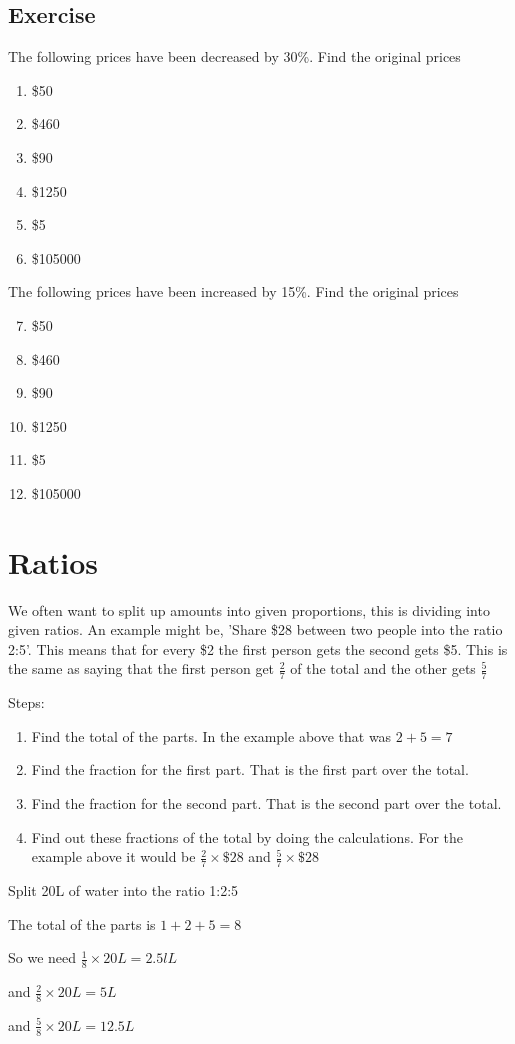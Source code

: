 \subsection{Exercise}
The following prices have been decreased by 30\%.  Find the original prices
\begin{enumerate}
	\item \$50
	\item \$460
	\item \$90
	\item \$1250
	\item \$5
	\item \$105000
\end{enumerate}
The following prices have been increased by 15\%.  Find the original prices
\begin{enumerate}
	\setcounter{enumi}{6}
	\item \$50
	\item \$460
	\item \$90
	\item \$1250
	\item \$5
	\item \$105000
\end{enumerate}
\section{Ratios}
We often want to split up amounts into given proportions, this is dividing into given ratios.  An example might be, 'Share \$28 between two people into the ratio 2:5'.  This means that for every \$2 the first person gets the second gets \$5.  This is the same as saying that the first person get $\displaystyle \frac{2}{7}$ of the total and the other gets $\displaystyle \frac{5}{7}$

Steps:

\begin{enumerate}
	\item Find the total of the parts.  In the example above that was $2+5=7$
	\item Find the fraction for the first part.  That is the first part over the total.
	\item Find the fraction for the second part.  That is the second part over the total.
	\item Find out these fractions of the total by doing the calculations.  For the example above it would be $\displaystyle \frac{2}{7} \times \$28$ and $\displaystyle \frac{5}{7} \times \$28$
\end{enumerate}
\begin{exmp}
Split 20L of water into the ratio 1:2:5

The total of the parts is $1+2+5=8$

\bigskip

So we need $\displaystyle \frac{1}{8} \times 20L = 2.5lL$

\bigskip

and $\displaystyle \frac{2}{8} \times 20L = 5L$

\bigskip

and $\displaystyle \frac{5}{8} \times 20L = 12.5L$
\end{exmp}
